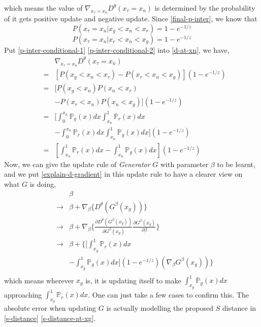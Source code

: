 \documentclass[letterpaper]{article} %
\begin{document}
which means the value of $\nabla_{x_{\tau}=x_n} D^{\theta}(x_{\tau}=x_n)$ is determined by the probability of it gets positive update and negative update.
Since \eqref{final-p-inter}, we know that
\begin{equation}\label{p-inter-conditional-1}
  P(x_\tau=x_n|x_g<x_n<x_r)=1 - e^{-1/z}
\end{equation}
\begin{equation}\label{p-inter-conditional-2}
  P(x_\tau=x_n|x_r<x_n<x_g)=1 - e^{-1/z}
\end{equation}
Put \eqref{p-inter-conditional-1} \eqref{p-inter-conditional-2} into \eqref{d-at-xn}, we have,
\begin{eqnarray}\label{explain-d-gradient}
    && \nabla_{x_{\tau}=x_n} D^{\theta}(x_{\tau}=x_n) \nonumber\\
    &=& [P(x_g<x_n<x_r) - P(x_r<x_n<x_g)](1 - e^{-1/z}) \nonumber\\
    &=& [P(x_g<x_n)P(x_n<x_r) \nonumber\\
    && - P(x_r<x_n)P(x_n<x_g)](1 - e^{-1/z}) \nonumber\\
    &=& [\int_{0}^{x_n}\mathbb{P}_g(x)dx \int_{x_n}^{1}\mathbb{P}_r(x)dx \nonumber\\
    && - \int_{0}^{x_n}\mathbb{P}_r(x)dx \int_{x_n}^{1}\mathbb{P}_g(x)dx](1 - e^{-1/z}) \nonumber\\
    &=& [\int_{x_n}^{1}\mathbb{P}_r(x)dx-\int_{x_n}^{1}\mathbb{P}_g(x)dx](1 - e^{-1/z})
\end{eqnarray}
Now, we can give the update rule of \textit{Generator} $G$ with parameter $\beta$ to be learnt, and we put \eqref{explain-d-gradient} in this update rule to have a clearer view on what $G$ is doing,
\begin{eqnarray}\label{g-loss}
  && \beta \nonumber\\
  & \longrightarrow & \beta + \nabla_{\beta} \{ D^{\theta}(G^{\beta}(x_g)) \} \nonumber\\
  & \longrightarrow & \beta + \nabla_{\beta} \{ \frac{\partial D^{\theta}(G^{\beta}(x_g))}{\partial G^{\beta}(x_g)} \frac{\partial G^{\beta}(x_g)}{\partial \beta} \} \nonumber\\
  & \longrightarrow & \beta + \{[\int_{x_g}^{1}\mathbb{P}_r(x)dx\nonumber\\
  && -\int_{x_g}^{1}\mathbb{P}_g(x)dx](1 - e^{-1/z})(\nabla_{\beta}G^{\beta}(x_g)) \} \nonumber\\
\end{eqnarray}
which means wherever $x_g$ is, it is updating itself to make $\int_{x_g}^{1}\mathbb{P}_g(x)dx$ approaching $\int_{x_g}^{1}\mathbb{P}_r(x)dx$.
One can just take a few cases to confirm this.
The absolute error when updating $G$ is actually modelling the proposed $S$ distance in \eqref{s-distance} \eqref{s-distance-at-xg}.
\end{document}
